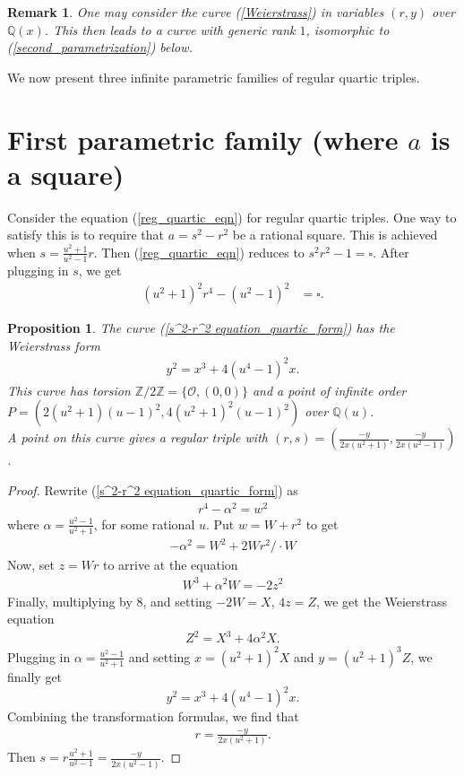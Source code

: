 \documentclass{amsart}
\newtheorem{prop}{Proposition}
\newtheorem{remark}{Remark}
\begin{document}
\begin{remark}
One may consider the curve (\ref{Weierstrass}) in variables $(r,y)$ over $\mathbb{Q}(x)$. This then leads to a curve with generic rank $1$, isomorphic to (\ref{second_parametrization}) below.
\end{remark}
We now present three infinite parametric families of regular quartic triples. 

\section{First parametric family (where $a$ is a square)}
Consider the equation (\ref{reg_quartic_eqn}) for regular quartic triples.
One way to satisfy this is to require that $a = s^2-r^2$ be a rational square. This is achieved when $s= \frac{u^2+1}{u^2-1}r$. Then (\ref{reg_quartic_eqn}) reduces to $s^2r^2-1 = \square$. After plugging in $s$, we get
\begin{align} \label{s^2-r^2 equation_quartic_form}
    (u^2+1)^2r^4 - (u^2-1)^2 &= \square.
\end{align}

\begin{prop}
    The curve (\ref{s^2-r^2 equation_quartic_form}) has the Weierstrass form \begin{align} \label{s^2-r^2 equation_Weierstrass_form}
        y^2 = x^3 + 4(u^4-1)^2x.
    \end{align}
    This curve has torsion $\mathbb{Z}/2\mathbb{Z} = \{\mathcal{O}, (0,0)\}$ and a point of infinite order $P = (2(u^2+1)(u-1)^2, 4(u^2+1)^2(u-1)^2)$ over $\mathbb{Q}(u)$.\\
    A point on this curve gives a regular triple with $(r,s)=\left(\frac{-y}{2x(u^2+1)}, \frac{-y}{2x(u^2-1)}\right)$.
\end{prop}
\begin{proof} Rewrite (\ref{s^2-r^2 equation_quartic_form}) as
\begin{align*}
    r^4-\alpha^2 = w^2
\end{align*}
where $\alpha = \frac{u^2-1}{u^2+1}$, for some rational $u$. Put $w = W + r^2$ to get
\begin{align*}
    -\alpha^2 = W^2+2Wr^2\Big /\cdot W
\end{align*}
Now, set $z = Wr$ to arrive at the equation
\begin{align*}
    W^3+\alpha^2W = -2z^2
\end{align*}
Finally, multiplying by $8$, and setting $-2W = X$, $4z=Z$, we get the Weierstrass equation
\begin{align*}
    Z^2 =  X^3+4\alpha^2 X.
\end{align*}
Plugging in $\alpha=\frac{u^2-1}{u^2+1}$ and setting $x = (u^2+1)^2 X$ and $y = (u^2+1)^3Z$, we finally get \[y^2=x^3+4(u^4-1)^2x.\]
Combining the transformation formulas, we find that
\begin{align*}
    r = \frac{-y}{2x(u^2+1)}. 
\end{align*}
Then $s=r \frac{u^2+1}{u^2-1} = \frac{-y}{2x(u^2-1)}$. 
\end{proof}
\end{document}
